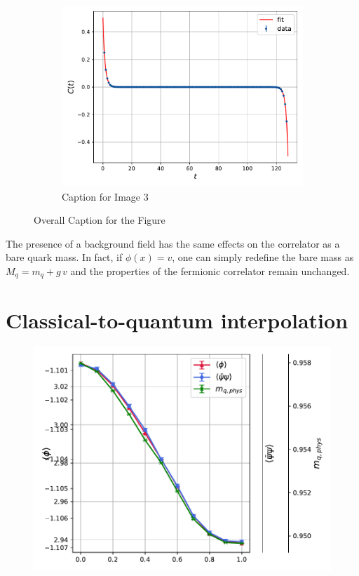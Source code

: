 \begin{figure}
\begin{subfigure}[b]{0.45\textwidth}
        \includegraphics[width=\textwidth]{figures/correlator/corrs_free/corr_big.pdf}
        \caption{Caption for Image 3}
    \end{subfigure}
    \caption{Overall Caption for the Figure}
\end{figure}
The presence of a background field has the same effects on the correlator as a bare quark mass. In fact, if $\phi(x) = v$, one can simply redefine the bare mass as $M_q = m_q + g \, v$ and the properties of the fermionic correlator remain unchanged.

\newpage
\section{Classical-to-quantum interpolation}
\label{sec:classical_to_quantum}

\begin{figure}
    \centering
    \includegraphics[scale=0.7]{figures/slide_broken/mag_cond.pdf}
\end{figure}

